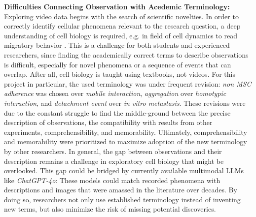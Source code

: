 \textbf{Difficulties Connecting Observation with Acedemic Terminology:}
Exploring video data begins with the search of scientific novelties. In order to
correctly identify cellular phenomena relevant to the research question, a deep
understanding of cell biology is required, e.g. in field of cell dynamics to
read migratory behavior \cite{nalbantExploratoryCellDynamics2018}. This is a
challenge for both students and experienced researchers, since finding the
academically correct terms to describe observations is difficult, especially for
novel phenomena or a sequence of events that can overlap. After all, cell
biology is taught using textbooks, not videos. For this project in particular,
the used terminology was under frequent revision: 
\emph{non MSC adherence} was chosen over \emph{mobile interaction},
\emph{aggregation} over \emph{homotypic interaction}, and \emph{detachment
event} over \emph{in vitro metastasis}. 
These revisions were due to the constant struggle to
find the middle-ground between the precise description of observations, the
compatibility with results from other experiments, comprehensibility, and
memorability. Ultimately, comprehensibility and memorability were prioritized to
maximize adoption of the new terminology by other researchers. 
In general, the gap between observations
and their description remains a challenge in exploratory cell biology that might
be overlooked. This gap could be bridged by currently available multimodal
\acp{LLM} like \textit{ChatGPT-4o}: These models could match recorded phenomena
with descriptions and images that were amassed in the literature over decades.
By doing so, researchers not only use established terminology instead of
inventing new terms, but also minimize the risk of missing potential
discoveries.


